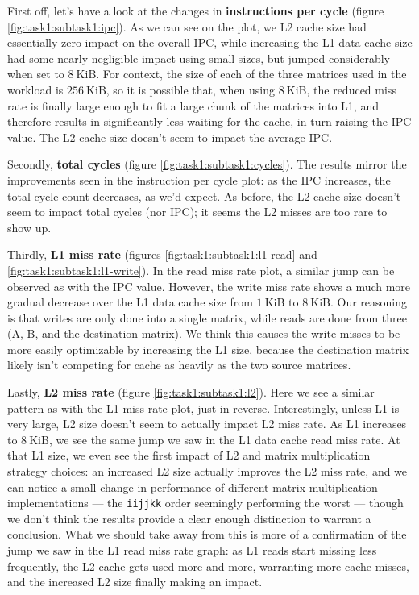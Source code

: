 \documentclass[10pt]{article}
\begin{document}
First off, let's have a look at the changes in \textbf{instructions per cycle} (figure \ref{fig:task1:subtask1:ipc}).
As we can see on the plot, we L2 cache size had essentially zero impact on the overall IPC, while increasing the L1 data cache size had some nearly negligible impact using small sizes, but jumped considerably when set to $8~\text{KiB}$. For context, the size of each of the three matrices used in the workload is $256~\text{KiB}$, so it is possible that, when using $8~\text{KiB}$, the reduced miss rate is finally large enough to fit a large chunk of the matrices into L1, and therefore results in significantly less waiting for the cache, in turn raising the IPC value. The L2 cache size doesn't seem to impact the average IPC.

Secondly, \textbf{total cycles} (figure \ref{fig:task1:subtask1:cycles}). 
The results mirror the improvements seen in the instruction per cycle plot: as the IPC increases, the total cycle count decreases, as we'd expect. As before, the L2 cache size doesn't seem to impact total cycles (nor IPC); it seems the L2 misses are too rare to show up.

Thirdly, \textbf{L1 miss rate} (figures \ref{fig:task1:subtask1:l1-read} and \ref{fig:task1:subtask1:l1-write}). 
In the read miss rate plot, a similar jump can be observed as with the IPC value. However, the write miss rate shows a much more gradual decrease over the L1 data cache size from $1~\text{KiB}$ to $8~\text{KiB}$. Our reasoning is that writes are only done into a single matrix, while reads are done from three (A, B, and the destination matrix). We think this causes the write misses to be more easily optimizable by increasing the L1 size, because the destination matrix likely isn't competing for cache as heavily as the two source matrices.

Lastly, \textbf{L2 miss rate} (figure \ref{fig:task1:subtask1:l2}).
Here we see a similar pattern as with the L1 miss rate plot, just in reverse.
Interestingly, unless L1 is very large, L2 size doesn't seem to actually impact L2 miss rate. As L1 increases to $8~\text{KiB}$, we see the same jump we saw in the L1 data cache read miss rate. At that L1 size, we even see the first impact of L2 and matrix multiplication strategy choices: an increased L2 size actually improves the L2 miss rate, and we can notice a small change in performance of different matrix multiplication implementations --- the \texttt{iijjkk} order seemingly performing the worst --- though we don't think the results provide a clear enough distinction to warrant a conclusion. What we should take away from this is more of a confirmation of the jump we saw in the L1 read miss rate graph: as L1 reads start missing less frequently, the L2 cache gets used more and more, warranting more cache misses, and the increased L2 size finally making an impact.
\end{document}
